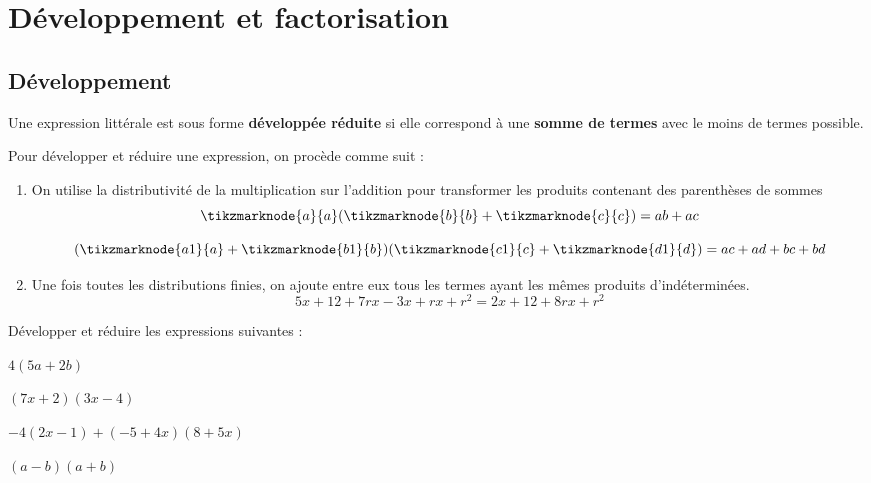 \documentclass{poly}
\begin{document}
\newpage
\section{Développement et factorisation}
\subsection{Développement}
\begin{definition}
Une expression littérale est sous forme \textbf{développée réduite} si elle correspond à une \textbf{somme de termes} avec le moins de termes possible.
\end{definition}
\begin{method}
Pour développer et réduire une expression, on procède comme suit :
\begin{enumerate}
\item On utilise la distributivité de la multiplication sur l'addition pour transformer les produits contenant des \og parenthèses de sommes \fg 
\begin{equation*}
\tikzmarknode{a}{a}(\tikzmarknode{b}{b}+\tikzmarknode{c}{c}) = ab + ac
\end{equation*}

\begin{equation*}
(\tikzmarknode{a1}{a} + \tikzmarknode{b1}{b})(\tikzmarknode{c1}{c} + \tikzmarknode{d1}{d}) =
ac + ad + bc + bd
\end{equation*}
\item Une fois toutes les distributions finies, on ajoute entre eux tous les termes ayant les mêmes produits d'indéterminées.
\begin{equation*}
5x + 12 + 7rx -3x + rx + r^2 = 2x + 12 + 8rx + r^2
\end{equation*}
\end{enumerate}
\end{method}
\begin{example}
Développer et réduire les expressions suivantes :
\begin{alphaquestions}
\item $4(5a + 2b)$
\item $(7x + 2)(3x - 4)$
\item $-4(2x - 1) + (-5 + 4x)(8 + 5x)$
\item $(a - b)(a + b)$
\end{alphaquestions}
\end{example}
\end{document}

